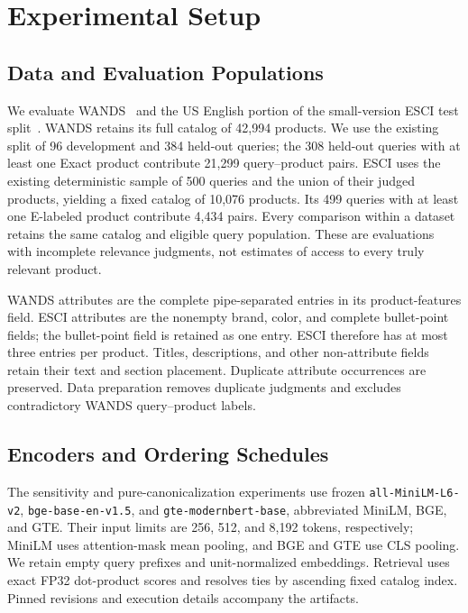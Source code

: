\section{Experimental Setup}
\label{sec:experimental_setup}

\subsection{Data and Evaluation Populations}
\label{sec:evaluation_populations}

We evaluate WANDS~\cite{chen2022wands} and the US English portion of the small-version ESCI test split~\cite{reddy2022shopping}. WANDS retains its full catalog of 42,994 products. We use the existing split of 96 development and 384 held-out queries; the 308 held-out queries with at least one Exact product contribute 21,299 query--product pairs. ESCI uses the existing deterministic sample of 500 queries and the union of their judged products, yielding a fixed catalog of 10,076 products. Its 499 queries with at least one E-labeled product contribute 4,434 pairs. Every comparison within a dataset retains the same catalog and eligible query population. These are evaluations with incomplete relevance judgments, not estimates of access to every truly relevant product.

WANDS attributes are the complete pipe-separated entries in its product-features field. ESCI attributes are the nonempty brand, color, and complete bullet-point fields; the bullet-point field is retained as one entry. ESCI therefore has at most three entries per product. Titles, descriptions, and other non-attribute fields retain their text and section placement. Duplicate attribute occurrences are preserved. Data preparation removes duplicate judgments and excludes contradictory WANDS query--product labels.

\subsection{Encoders and Ordering Schedules}
\label{sec:encoders_schedules}

The sensitivity and pure-canonicalization experiments use frozen \texttt{all-MiniLM-L6-v2}, \texttt{bge-base-en-v1.5}, and \texttt{gte-modernbert-base}, abbreviated MiniLM, BGE, and GTE. Their input limits are 256, 512, and 8,192 tokens, respectively; MiniLM uses attention-mask mean pooling, and BGE and GTE use CLS pooling. We retain empty query prefixes and unit-normalized embeddings. Retrieval uses exact FP32 dot-product scores and resolves ties by ascending fixed catalog index. Pinned revisions and execution details accompany the artifacts.

